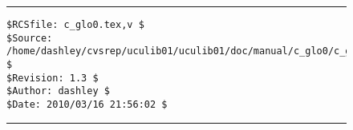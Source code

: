 \begin{vworktermglossaryenum}
%
%
%
%
%
%
%

\end{vworktermglossaryenum}


\noindent\begin{figure}[!b]
\noindent\rule[-0.25in]{\textwidth}{1pt}
\begin{tiny}
\begin{verbatim}
$RCSfile: c_glo0.tex,v $
$Source: /home/dashley/cvsrep/uculib01/uculib01/doc/manual/c_glo0/c_glo0.tex,v $
$Revision: 1.3 $
$Author: dashley $
$Date: 2010/03/16 21:56:02 $
\end{verbatim}
\end{tiny}
\noindent\rule[0.25in]{\textwidth}{1pt}
\end{figure}

%
%
%


